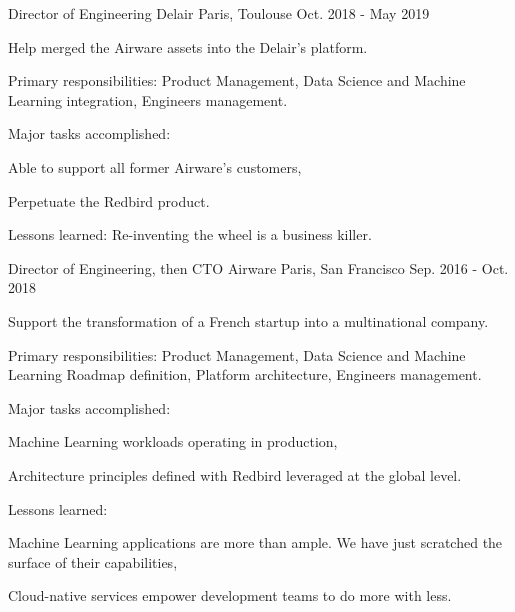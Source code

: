 \begin{cventries}
  \cventry
    {Director of Engineering} %
    {Delair} %
    {Paris, Toulouse} %
    {Oct. 2018 - May 2019} %
    {
      \begin{cvitems} %
        \item {Help merged the Airware assets into the Delair's platform.}
        \item {Primary responsibilities: Product Management, Data Science and Machine Learning integration, Engineers management.}
        \item {Major tasks accomplished:}
        \begin{cvsubitems}
          \item {Able to support all former Airware's customers,}
          \item {Perpetuate the Redbird product.}
        \end{cvsubitems}
        \item {Lessons learned: Re-inventing the wheel is a business killer.}
      \end{cvitems}
    }

  \cventry
    {Director of Engineering, then CTO} %
    {Airware} %
    {Paris, San Francisco} %
    {Sep. 2016 - Oct. 2018} %
    {
      \begin{cvitems} %
        \item {Support the transformation of a French startup into a multinational company.}
        \item {Primary responsibilities: Product Management, Data Science and Machine Learning Roadmap definition, Platform architecture, Engineers management.}
        \item {Major tasks accomplished:}
        \begin{cvsubitems}
          \item {Machine Learning workloads operating in production,}
          \item {Architecture principles defined with Redbird leveraged at the global level.}
        \end{cvsubitems}
        \item {Lessons learned:}
        \begin{cvsubitems}
          \item {Machine Learning applications are more than ample. We have just scratched the surface of their capabilities,}
          \item {Cloud-native services empower development teams to do more with less.}
        \end{cvsubitems}
      \end{cvitems}
    }


\end{cventries}
